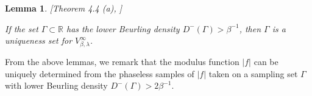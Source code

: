 \documentclass[11pt,oneside,reqno]{amsart}
\newtheorem{lem}[thm]{Lemma}
\numberwithin{equation}{section}
\def\R{ {\mathbb R} }
\def\Vbeta{V^\infty_{\beta,\lambda}}
\begin{document}
 \begin{lem}\label{sampling.lem}{\rm[Theorem 4.4 (a), \cite{GRS2018}]}
{\rm 
 If the set $\Gamma\subset\R$ has the lower Beurling density $D^-(\Gamma)>\beta^{-1}$, then $\Gamma$ is a uniqueness set for $V_{\beta,\lambda}^{\infty}$.

  }
\end{lem}



From the above lemmas, we remark that the modulus function $|f|$ can be uniquely determined from the phaseless samples of $|f|$ taken on  a sampling set $\Gamma$ with lower Beurling density $D^-(\Gamma)> 2\beta^{-1}$.  
\end{document}
